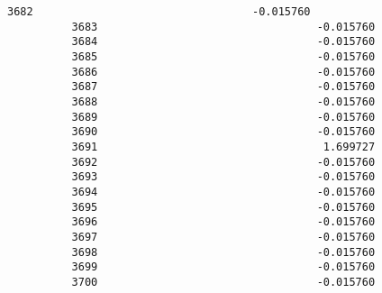 \documentclass[11pt]{article}
\begin{document}
\begin{Verbatim}[commandchars=\\\{\}]
          3682                                  -0.015760   
          3683                                  -0.015760   
          3684                                  -0.015760   
          3685                                  -0.015760   
          3686                                  -0.015760   
          3687                                  -0.015760   
          3688                                  -0.015760   
          3689                                  -0.015760   
          3690                                  -0.015760   
          3691                                   1.699727   
          3692                                  -0.015760   
          3693                                  -0.015760   
          3694                                  -0.015760   
          3695                                  -0.015760   
          3696                                  -0.015760   
          3697                                  -0.015760   
          3698                                  -0.015760   
          3699                                  -0.015760   
          3700                                  -0.015760   
          

\end{Verbatim}
\end{document}
